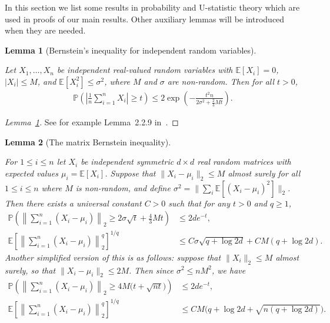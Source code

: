 \documentclass[11pt,lof]{puthesis}
\renewcommand{\P}{\ensuremath{\mathbb{P}}}
\newcommand{\E}{\ensuremath{\mathbb{E}}}
\theoremstyle{break}
\newtheorem{lemma}{Lemma}[section]
\theoremstyle{proof}
\newtheorem{proof}{Proof}
\begin{document}
In this section we list some results
in probability and U-statistic theory
which are used in proofs of our main results.
Other auxiliary lemmas will be introduced when
they are needed.

\begin{lemma}[Bernstein's inequality for independent random variables]
  \label{lem:kernel_app_bernstein}

  Let $X_1, \ldots, X_n$ be independent real-valued
  random variables with
  $\E[X_i] = 0$, $|X_i| \leq M$, and
  $\E[X_i^2] \leq \sigma^2$,
  where $M$ and $\sigma$ are non-random.
  Then for all $t>0$,
  \begin{align*}
    \P \left(
      \left| \frac{1}{n} \sum_{i=1}^n X_i \right| \geq t
    \right)
    \leq 2 \exp \left( -
      \frac{t^2 n}
      {2 \sigma^2 + \frac{2}{3} M t}
    \right).
  \end{align*}

\end{lemma}

\begin{proof}[Lemma~\ref{lem:kernel_app_bernstein}]

  See for example
  Lemma~2.2.9 in~\citet{van1996weak}.
\end{proof}

\begin{lemma}[The matrix Bernstein inequality]
  \label{lem:kernel_app_matrix_bernstein}

  For $1 \leq i \leq n$
  let $X_i$ be independent symmetric $d \times d$
  real random matrices
  with expected values $\mu_i = \E[X_i]$.
  Suppose that
  $\|X_i - \mu_i\|_2 \leq M$
  almost surely for all $1 \leq i \leq n$
  where $M$ is non-random, and define
  $\sigma^2 = \big\| \sum_i \E[(X_i - \mu_i)^2] \big\|_2$.
  Then there exists a universal constant $C > 0$
  such that
  for any $t > 0$ and $q \geq 1$,
  \begin{align*}
    \P\left(
      \left\|
      \sum_{i=1}^n
      \left(
        X_i - \mu_i
      \right)
      \right\|_2
      \geq
      2 \sigma \sqrt{t}
      + \frac{4}{3} M t
    \right)
    &\leq
    2 d e^{-t}, \\
    \E\left[
      \left\|
      \sum_{i=1}^n
      \left(
        X_i - \mu_i
      \right)
      \right\|_2^q
    \right]^{1/q}
    &\leq
    C \sigma \sqrt{q + \log 2d}
    + C M (q + \log 2d).
  \end{align*}
  Another simplified version of this is as follows:
  suppose that
  $\|X_i\|_2 \leq M$ almost surely,
  so that
  $\|X_i - \mu_i\|_2 \leq 2M$.
  Then since
  $\sigma^2 \leq n M^2$,
  we have
  \begin{align*}
    \P\left(
      \left\|
      \sum_{i=1}^n
      \left(
        X_i - \mu_i
      \right)
      \right\|_2
      \geq
      4M \big(t + \sqrt{n t}\big)
    \right)
    &\leq
    2 d e^{-t}, \\
    \E\left[
      \left\|
      \sum_{i=1}^n
      \left(
        X_i - \mu_i
      \right)
      \right\|_2^q
    \right]^{1/q}
    &\leq
    C M
    \big(q + \log 2d + \sqrt{n(q + \log 2d)}\big).
  \end{align*}

\end{lemma}
\end{document}
